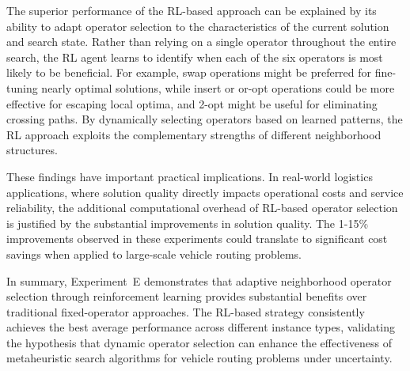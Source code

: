 The superior performance of the RL-based approach can be explained by its ability to adapt operator selection to the characteristics of the current solution and search state. Rather than relying on a single operator throughout the entire search, the RL agent learns to identify when each of the six operators is most likely to be beneficial. For example, swap operations might be preferred for fine-tuning nearly optimal solutions, while insert or or-opt operations could be more effective for escaping local optima, and 2-opt might be useful for eliminating crossing paths. By dynamically selecting operators based on learned patterns, the RL approach exploits the complementary strengths of different neighborhood structures.

These findings have important practical implications. In real-world logistics applications, where solution quality directly impacts operational costs and service reliability, the additional computational overhead of RL-based operator selection is justified by the substantial improvements in solution quality. The 1-15\% improvements observed in these experiments could translate to significant cost savings when applied to large-scale vehicle routing problems.

In summary, Experiment~E demonstrates that adaptive neighborhood operator selection through reinforcement learning provides substantial benefits over traditional fixed-operator approaches. The RL-based strategy consistently achieves the best average performance across different instance types, validating the hypothesis that dynamic operator selection can enhance the effectiveness of metaheuristic search algorithms for vehicle routing problems under uncertainty.
